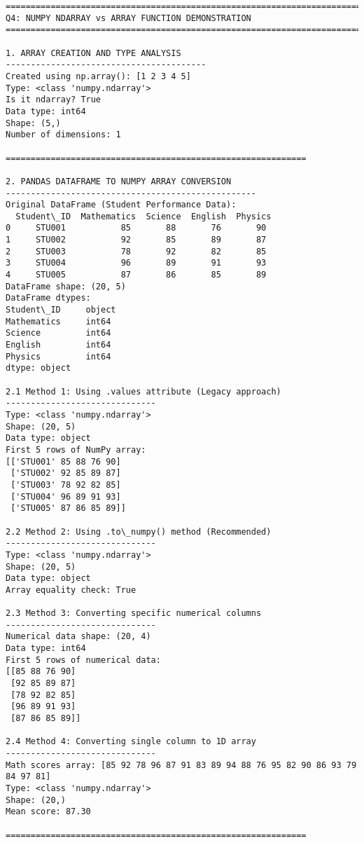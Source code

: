 \documentclass[11pt]{article}
\begin{document}
    \begin{Verbatim}[commandchars=\\\{\}]
================================================================================
Q4: NUMPY NDARRAY vs ARRAY FUNCTION DEMONSTRATION
================================================================================

1. ARRAY CREATION AND TYPE ANALYSIS
----------------------------------------
Created using np.array(): [1 2 3 4 5]
Type: <class 'numpy.ndarray'>
Is it ndarray? True
Data type: int64
Shape: (5,)
Number of dimensions: 1

============================================================

2. PANDAS DATAFRAME TO NUMPY ARRAY CONVERSION
--------------------------------------------------
Original DataFrame (Student Performance Data):
  Student\_ID  Mathematics  Science  English  Physics
0     STU001           85       88       76       90
1     STU002           92       85       89       87
2     STU003           78       92       82       85
3     STU004           96       89       91       93
4     STU005           87       86       85       89
DataFrame shape: (20, 5)
DataFrame dtypes:
Student\_ID     object
Mathematics     int64
Science         int64
English         int64
Physics         int64
dtype: object

2.1 Method 1: Using .values attribute (Legacy approach)
------------------------------
Type: <class 'numpy.ndarray'>
Shape: (20, 5)
Data type: object
First 5 rows of NumPy array:
[['STU001' 85 88 76 90]
 ['STU002' 92 85 89 87]
 ['STU003' 78 92 82 85]
 ['STU004' 96 89 91 93]
 ['STU005' 87 86 85 89]]

2.2 Method 2: Using .to\_numpy() method (Recommended)
------------------------------
Type: <class 'numpy.ndarray'>
Shape: (20, 5)
Data type: object
Array equality check: True

2.3 Method 3: Converting specific numerical columns
------------------------------
Numerical data shape: (20, 4)
Data type: int64
First 5 rows of numerical data:
[[85 88 76 90]
 [92 85 89 87]
 [78 92 82 85]
 [96 89 91 93]
 [87 86 85 89]]

2.4 Method 4: Converting single column to 1D array
------------------------------
Math scores array: [85 92 78 96 87 91 83 89 94 88 76 95 82 90 86 93 79 84 97 81]
Type: <class 'numpy.ndarray'>
Shape: (20,)
Mean score: 87.30

============================================================


\end{Verbatim}
\end{document}

